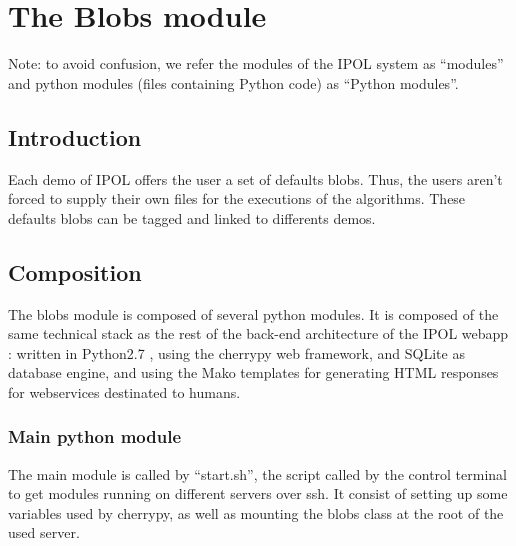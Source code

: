 \section{The Blobs module}


Note: to avoid confusion, we refer the modules of the IPOL system as ``modules'' and python modules (files containing Python code) as ``Python modules''.

\subsection{Introduction}
Each demo of IPOL offers the user a set of defaults blobs. Thus, the users aren't  forced to supply their own files for the executions of the algorithms. These defaults blobs can be tagged and linked to differents demos.

\subsection{Composition}
The blobs module is composed of several python  modules. It is composed of the same technical stack as the rest of the back-end architecture of the IPOL webapp :  written in Python2.7 , using the cherrypy web framework, and SQLite as database engine, and using the Mako templates for generating HTML responses for webservices destinated to humans. 

\subsubsection{Main python module}
The main module is called by ``start.sh'', the script called by the control terminal to get modules running on different servers over ssh. It consist of setting up some variables used by cherrypy, as well as mounting the blobs class at the root of the used server.

